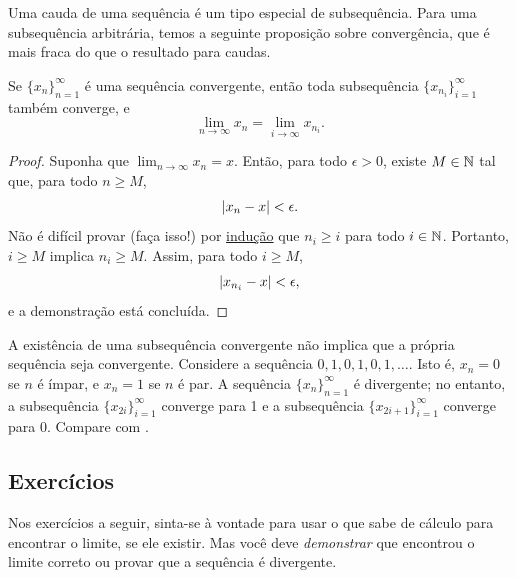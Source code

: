 Uma cauda de uma sequência é um tipo especial de subsequência. Para uma
subsequência arbitrária, temos a seguinte proposição sobre convergência,
que é mais fraca do que o resultado para caudas.

\begin{prop} \label{prop:seqtosubseq}
Se $\{ x_n \}_{n=1}^\infty$ é uma sequência convergente, então toda
subsequência $\{ x_{n_i} \}_{i=1}^\infty$ também converge, e
\begin{equation*}
\lim_{n\to \infty} x_n = 
\lim_{i\to \infty} x_{n_i} .
\end{equation*}
\end{prop}

\begin{proof}
Suponha que $\lim_{n\to \infty} x_n = x$. Então, para todo
$\epsilon > 0$, existe $M \in {\mathbb{N}}$ tal que, para todo $n \geq M$,
\begin{equation*}
\lvert {x_n - x} \rvert < \epsilon .
\end{equation*}
Não é difícil provar (faça isso!) por \hyperref[induction:thm]{indução} que
$n_i \geq i$ para todo $i \in {\mathbb{N}}$. Portanto, $i \geq M$ implica $n_i \geq M$.
Assim, para todo $i \geq M$,
\begin{equation*}
\lvert {x_{n_i} - x} \rvert < \epsilon ,
\end{equation*}
e a demonstração está concluída.
\end{proof}

\begin{example}
A existência de uma subsequência convergente não implica que a própria
sequência seja convergente.
Considere a sequência $0,1,0,1,0,1,\ldots$. Isto é,
$x_n = 0$ se $n$ é ímpar, e $x_n = 1$ se $n$ é par. A sequência
$\{ x_n \}_{n=1}^\infty$ é divergente; no entanto, a subsequência
$\{ x_{2i} \}_{i=1}^\infty$ converge para 1 e a subsequência
$\{ x_{2i+1} \}_{i=1}^\infty$ converge para 0. Compare com
.
\end{example}

\subsection{Exerc\'icios}

\begin{exnote}
Nos exercícios a seguir, sinta-se à vontade para usar o que sabe de cálculo
para encontrar o limite, se ele existir. Mas você deve \emph{demonstrar} que
encontrou o limite correto ou provar que a sequência é divergente.
\end{exnote}


